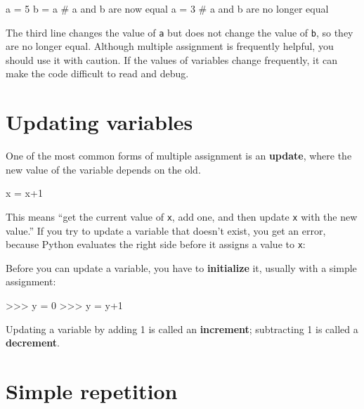 \beforeverb
\begin{pycode}
a = 5
b = a    # a and b are now equal
a = 3    # a and b are no longer equal
\end{pycode}
\afterverb
%
The third line changes the value of {\tt a} but does not change the
value of {\tt b}, so they are no longer equal. 
%
Although multiple assignment is frequently helpful, you should use it
with caution.  If the values of variables change frequently, it can
make the code difficult to read and debug.


\section{Updating variables}
\label{update}


One of the most common forms of multiple assignment is an {\bf update},
where the new value of the variable depends on the old.

\beforeverb
\begin{pycode}
x = x+1
\end{pycode}
\afterverb
%
This means ``get the current value of {\tt x}, add one, and then
update {\tt x} with the new value.''
%
If you try to update a variable that doesn't exist, you get an
error, because Python evaluates the right side before it assigns
a value to {\tt x}:

\beforeverb
{}
\afterverb
%
Before you can update a variable, you have to {\bf initialize}
it, usually with a simple assignment:


\beforeverb
\begin{pyinterpreter}
>>> y = 0
>>> y = y+1
\end{pyinterpreter}
\afterverb
%
Updating a variable by adding 1 is called an {\bf increment};
subtracting 1 is called a {\bf decrement}.



\section{Simple repetition}
\label{repetition}

